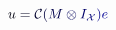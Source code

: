 \documentclass[12pt]{article}
\begin{document}
\makeatletter
\renewcommand*{\@textcolor}[3]{%
  \protect\leavevmode
  \begingroup
    \color#1{#2}#3%
  \endgroup
}
\makeatother
\begin{displaymath}
\mathcolor[RGB]{0,0,15}{u} \mathcolor[RGB]{0,0,30}{=} \mathcal { \mathcolor[RGB]{0,0,45}{C} } \mathcolor[RGB]{0,0,60}{(} \mathcolor[RGB]{0,0,75}{M} \mathcolor[RGB]{0,0,90}{\otimes} \mathcolor[RGB]{0,0,105}{I} _ { \mathcal { \mathcolor[RGB]{0,0,120}{X} } } \mathcolor[RGB]{0,0,135}{)} \mathcolor[RGB]{0,0,150}{e}
\end{displaymath}
\end{document}
